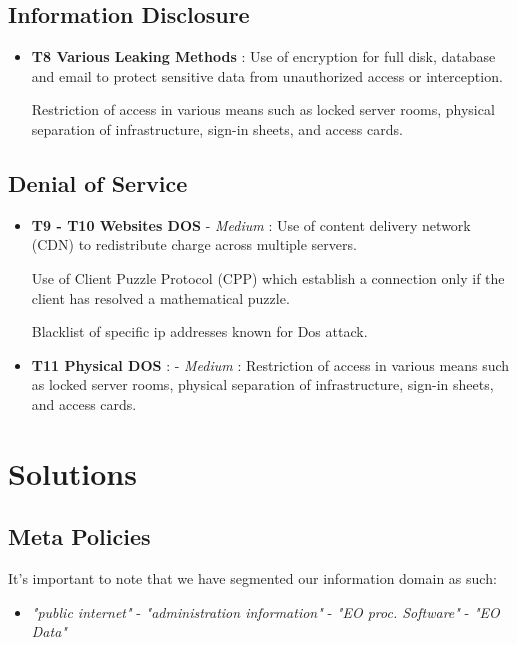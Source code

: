 \documentclass[12pt]{article}
\begin{document}
\subsection{Information Disclosure}
\begin{itemize}
    \item \textbf{T8 Various Leaking Methods} : Use of encryption for full disk, database and email to protect sensitive data from unauthorized access or interception.

    Restriction of access in various means such as locked server rooms, physical separation of infrastructure, sign-in sheets, and access cards. 
\end{itemize}

\subsection{Denial of Service}
\begin{itemize}
    \item \textbf{T9 - T10 Websites DOS} - \textit{Medium} : Use of content delivery network (CDN) to redistribute charge across multiple servers.

    Use of Client Puzzle Protocol (CPP) which establish a connection only if the client has resolved a mathematical puzzle.

    Blacklist of specific ip addresses known for Dos attack.
    \item \textbf{T11 Physical DOS} :  - \textit{Medium} : Restriction of access in various means such as locked server rooms, physical separation of infrastructure, sign-in sheets, and access cards. 
\end{itemize}





\newpage
\section{Solutions}\label{Sec: Solutions}

\subsection{Meta Policies}

It's important to note that we have segmented our information domain as such:
\begin{itemize}
    \item \textit{"public internet"} - \textit{"administration information"} - \textit{"EO proc. Software"} - \textit{"EO Data"}
\end{itemize}
\end{document}
